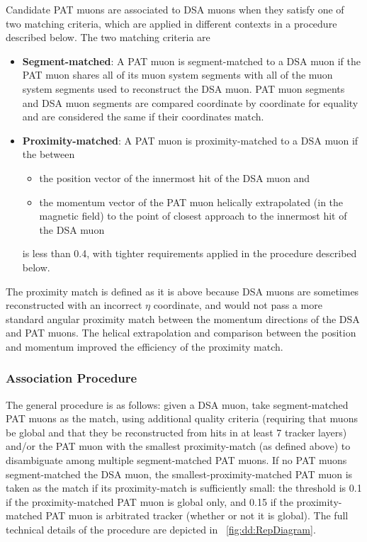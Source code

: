 Candidate PAT muons are associated to DSA muons when they satisfy one of two matching criteria, which are applied in different contexts in a procedure described below. The two matching criteria are
\begin{itemize}
  \item \textbf{Segment-matched}: A PAT muon is segment-matched to a DSA muon if the PAT muon shares all of its muon system segments with all of the muon system segments used to reconstruct the DSA muon. PAT muon segments and DSA muon segments are compared coordinate by coordinate for equality and are considered the same if their coordinates match.
  \item \textbf{Proximity-matched}: A PAT muon is proximity-matched to a DSA muon if the \deltaR between
    \begin{itemize}
      \item the position vector of the innermost hit of the DSA muon and
      \item the momentum vector of the PAT muon helically extrapolated (in the magnetic field) to the point of closest approach to the innermost hit of the DSA muon
    \end{itemize}
    is less than 0.4, with tighter requirements applied in the procedure described below.
\end{itemize}

The proximity match is defined as it is above because DSA muons are sometimes reconstructed with an incorrect $\eta$ coordinate, and would not pass a more standard angular proximity match between the momentum directions of the DSA and PAT muons.
The helical extrapolation and comparison between the position and momentum improved the efficiency of the proximity match.

\subsubsection{\DSAToPAT Association Procedure}
The general procedure is as follows: given a DSA muon, take segment-matched PAT muons as the match, using additional quality criteria (requiring that muons be global and that they be reconstructed from hits in at least 7 tracker layers) and/or the PAT muon with the smallest proximity-match \deltaR (as defined above) to disambiguate among multiple segment-matched PAT muons.
If no PAT muons segment-matched the DSA muon, the smallest-\deltaR proximity-matched PAT muon is taken as the match if its proximity-match \deltaR is sufficiently small: the threshold is 0.1 if the proximity-matched PAT muon is global only, and 0.15 if the proximity-matched PAT muon is arbitrated tracker (whether or not it is global).
The full technical details of the procedure are depicted in \Fig~\ref{fig:dd:RepDiagram}.

